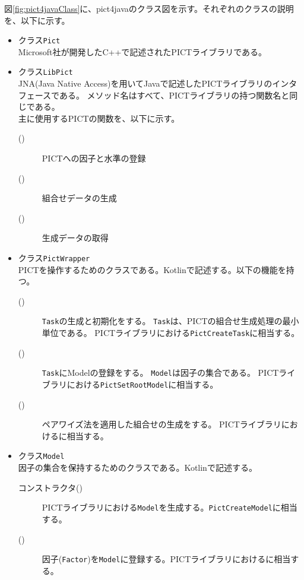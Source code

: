 \documentclass[uplatex, report, a4j, 10pt]{jsbook}
\newcommand\ttt[1]{\texttt{#1}}
\begin{document}
図\ref{fig:pict4javaClass}に、pict4javaのクラス図を示す。それぞれのクラスの説明を、以下に示す。
\begin{itemize}
  \item クラス\ttt{Pict}\\
        Microsoft社が開発したC++で記述されたPICTライブラリである。
  \item クラス\ttt{LibPict}\\
        JNA(Java Native Access)\cite{jna}を用いてJavaで記述したPICTライブラリのインタフェースである。
        メソッド名はすべて、PICTライブラリの持つ関数名と同じである。\\
        主に使用するPICTの関数を、以下に示す。
        \begin{description}
          \item[\PictAddParameter{}()] PICTへの因子と水準の登録
          \item[\PictGenerate{}()] 組合せデータの生成
          \item[\PictGetNextResultRow{}()] 生成データの取得
        \end{description}
  \item クラス\ttt{PictWrapper}\\
        PICTを操作するためのクラスである。Kotlin\cite{kotlin}で記述する。以下の機能を持つ。
        \begin{description}
          \item[\createTask{}()] \ttt{Task}の生成と初期化をする。
                \ttt{Task}は、PICTの組合せ生成処理の最小単位である。
                PICTライブラリにおける\ttt{PictCreateTask}に相当する。
          \item[\setRootModel{}()] \ttt{Task}にModelの登録をする。
                \ttt{Model}は因子の集合である。
                PICTライブラリにおける\ttt{PictSetRootModel}に相当する。
          \item[\generate{}()] ペアワイズ法を適用した組合せの生成をする。
                PICTライブラリにおける\PictGenerate{}に相当する。
        \end{description}
  \item クラス\ttt{Model}\\
        因子の集合を保持するためのクラスである。Kotlinで記述する。
        \begin{description}
          \item[コンストラクタ()] PICTライブラリにおける\ttt{Model}を生成する。\ttt{PictCreateModel}に相当する。
          \item[\addFactor{}()] 因子(\ttt{Factor})を\ttt{Model}に登録する。PICTライブラリにおける\PictAddParameter{}に相当する。

\end{description}
\end{itemize}
\end{document}
